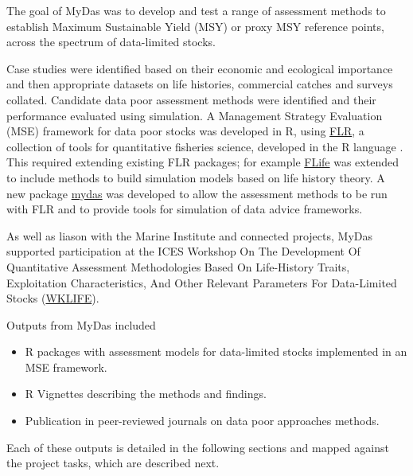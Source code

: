 
The goal of MyDas was to develop and test a range of assessment methods to establish Maximum Sustainable Yield (MSY) or proxy MSY reference points, across the spectrum of data-limited stocks. 

Case studies were identified based on their economic and ecological importance and then appropriate  datasets on life histories, commercial catches and surveys collated. Candidate data poor assessment methods were identified and their performance evaluated using simulation. A Management Strategy Evaluation (MSE) framework for data poor stocks was developed in R, using \href{http://www.flr-project.org/}{FLR}, a collection of tools for quantitative fisheries science, developed in the R language \citep{kell2007flr}. This required extending existing FLR packages; for example \href{https://github.com/flr/flife}{FLife} was extended to include methods to build simulation models based on life history theory. A new package \href{https://github.com/flr/mydas/wiki}{mydas} was developed to allow the assessment methods to be run with FLR and to provide tools for simulation of data advice frameworks.
 

As well as liason with the Marine Institute and connected projects, MyDas supported participation at the ICES Workshop On The Development Of Quantitative Assessment Methodologies Based On Life-History Traits, Exploitation Characteristics, And Other Relevant Parameters For Data-Limited Stocks (\href{https://www.ices.dk/community/groups/Pages/WKLIFEIX.aspx}{WKLIFE}).



Outputs from MyDas included

\begin{itemize}[noitemsep,topsep=0pt,parsep=0pt,partopsep=0pt]
 \item R packages with assessment models for data-limited stocks implemented in an MSE framework. 
 \item R Vignettes describing the methods and findings.
 \item Publication in peer-reviewed journals on data poor approaches methods.
\end{itemize}

Each of these outputs is detailed in the following sections and mapped against the project tasks, which are described next.
